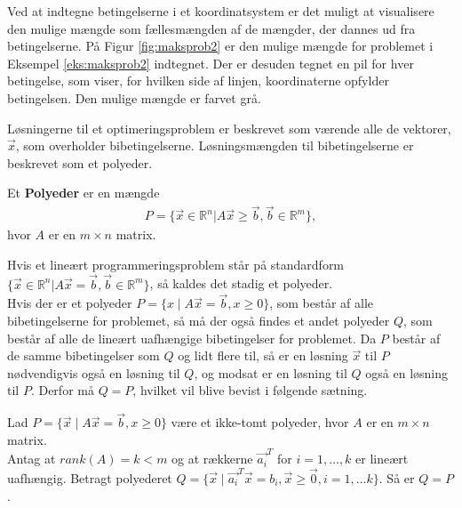 \begin{eks}
Ved at indtegne betingelserne i et koordinatsystem er det muligt at visualisere den mulige mængde som fællesmængden af de mængder, der dannes ud fra betingelserne. På Figur \ref{fig:maksprob2} er den mulige mængde for problemet i Eksempel \ref{eks:maksprob2} indtegnet. Der er desuden tegnet en pil for hver betingelse, som viser, for hvilken side af linjen, koordinaterne opfylder betingelsen. Den mulige mængde er farvet grå.

\begin{center}
	
	\label{fig:maksprob2}
\end{center}
\end{eks}

Løsningerne til et optimeringsproblem er beskrevet som værende alle de vektorer, $\vec{x}$, som overholder bibetingelserne. Løsningsmængden til bibetingelserne er beskrevet som et polyeder.
\begin{defn} [Polyeder]
Et \textbf{Polyeder} er en mængde 
\begin{align*}
 P =\{ \vec{x} \in \mathds{R}^n | A \vec{x} \geq \vec{b}, \vec{b}\in \mathds{R}^m\},
\end{align*}
hvor $A$ er en $m \times n$ matrix.
\end{defn}
Hvis et lineært programmeringsproblem står på standardform $\{ \vec{x} \in \mathds{R}^n | A \vec{x} = \vec{b}, \vec{b}\in \mathds{R}^m\}$, så kaldes det stadig et polyeder.\\
Hvis der er et polyeder $P=\{x\mid A\vec{x}=\vec{b},x\geq 0\}$, som består af alle bibetingelserne for problemet, så må der også findes et andet polyeder $Q$, som består af alle de lineært uafhængige bibetingelser for problemet. Da $P$ består af de samme bibetingelser som $Q$ og lidt flere til, så er en løsning $\vec{x}$ til $P$ nødvendigvis også en løsning til $Q$, og modsat er en løsning til $Q$ også en løsning til $P$. Derfor må $Q=P$, hvilket vil blive bevist i følgende sætning.

\begin{stn} 
Lad $P=\{\vec{x}\mid A\vec{x}=\vec{b},x\geq 0\}$ være et ikke-tomt polyeder, hvor $A$ er en $m\times n$ matrix.\\
Antag at $rank(A)=k<m$ og at rækkerne $\vec{a_i}^T$ for $i=1,\dots ,k$ er lineært uafhængig. Betragt polyederet $Q=\{\vec{x}\mid \vec{a_i}^T\vec{x}=b_{i}, \vec{x}\geq \vec{0}, i = 1,\dots	k\}$. Så er $Q=P$.
\label{stn:PQ}
\end{stn}

